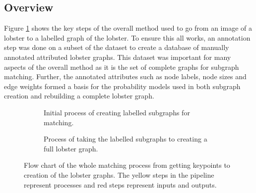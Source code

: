 \subsection{Overview}
Figure \ref{fig:overview} shows the key steps of the overall method used to go from an image of a lobster to a labelled graph of the lobster. To ensure this all works, an annotation step was done on a subset of the dataset to create a database of manually annotated attributed lobster graphs. This dataset was important for many aspects of the overall method as it is the set of complete graphs for subgraph matching. Further, the annotated attributes such as node labels, node sizes and edge weights formed a basis for the probability models used in both subgraph creation and rebuilding a complete lobster graph.
\begin{figure}[H]
\centering
\begin{subfigure}{\textwidth}
\centering
{}
\caption{Initial process of creating labelled subgraphs for matching.}
\vspace{0.7cm}
\end{subfigure}

\begin{subfigure}{\textwidth}
\centering
{}
\caption{Process of taking the labelled subgraphs to creating a full lobster graph.}
\end{subfigure}
\caption{Flow chart of the whole matching process from getting keypoints to creation of the lobster graphs. The yellow steps in the pipeline represent processes and red steps represent inputs and outputs.}
\label{fig:overview}
\end{figure}
